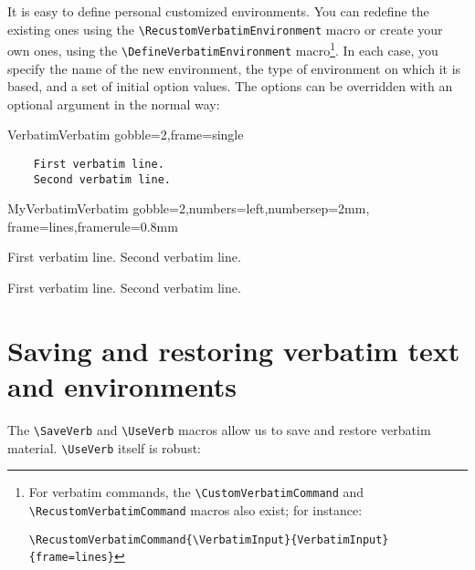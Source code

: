 \documentclass{article}
\newif\ifChangeBar \ChangeBarfalse
\newcommand\cs[1]{\texttt{\textbackslash#1}}
\begin{document}
\ifChangeBar\begin{changebar}\fi
\VerbatimFootnotes
  It is easy to define personal customized environments. You can redefine
the existing ones using the \cs{RecustomVerbatimEnvironment} macro or create
your own ones, using the \cs{DefineVerbatimEnvironment} macro\footnote{%
\ifChangeBar\begin{changebar}\fi
For verbatim commands, the \cs{CustomVerbatimCommand} and
\cs{RecustomVerbatimCommand} macros also exist; for instance:

\noindent
\verb+\RecustomVerbatimCommand{\VerbatimInput}{VerbatimInput}{frame=lines}+
\ifChangeBar\end{changebar}\fi}.
In each case, you specify the name of the new environment, the type of
environment on which it is based, and a set of initial option values. The
options can be overridden with an optional argument in the normal way:

\begin{SideBySideExample}
  \RecustomVerbatimEnvironment
    {Verbatim}{Verbatim}
    {gobble=2,frame=single}
  \begin{Verbatim}
    First verbatim line.
    Second verbatim line.
  \end{Verbatim}
\end{SideBySideExample}
\ifChangeBar\end{changebar}\fi

\begin{SideBySideExample}
  \DefineVerbatimEnvironment%
    {MyVerbatim}{Verbatim}
    {gobble=2,numbers=left,numbersep=2mm,
     frame=lines,framerule=0.8mm}
  \begin{MyVerbatim}
    First verbatim line.
    Second verbatim line.
  \end{MyVerbatim}

  \begin{MyVerbatim}[numbers=none,
                     framerule=1pt]
    First verbatim line.
    Second verbatim line.
  \end{MyVerbatim}
\end{SideBySideExample}

\section{Saving and restoring verbatim text and environments}

  The \cs{SaveVerb} and \cs{UseVerb} macros allow us to save and restore
verbatim material. \cs{UseVerb} itself is robust:
\end{document}
